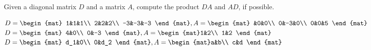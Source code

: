 
\begin{Exercise}[
name={},
title={}, 
difficulty=0,
origin={\cite{GH}}]
Given a diagonal matrix $D$ and a matrix $A$, compute the product $DA$ and $AD$, if possible.
\begin{multicols}{2}
\Question $D=\begin{mat} 1&1&1\\  2&2&2\\  -3&-3&-3 \end{mat}, \\ A=\begin{mat} &0&0\\  0&-3&0\\  0&0&5 \end{mat}$
\Question $D=\begin{mat} 4&0\\  0&-3 \end{mat}, \\ A=\begin{mat}1&2\\  1&2  \end{mat}$
\Question $D=\begin{mat} d_1&0\\  0&d_2 \end{mat}, \\ A=\begin{mat}a&b\\  c&d  \end{mat}$

\end{multicols}
\end{Exercise}
